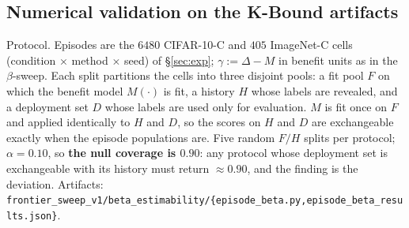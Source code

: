 \subsection{Numerical validation on the K-Bound artifacts}
\label{epi:sec-numerics}

Protocol. Episodes are the $6480$ CIFAR-10-C and $405$ ImageNet-C cells (condition $\times$ method
$\times$ seed) of \S\ref{sec:exp}; $\gamma:=\Delta-M$ in benefit units as in the
$\beta$-sweep. Each split partitions the cells into three disjoint pools: a fit pool $F$ on which the
benefit model $M(\cdot)$ is fit, a history $H$ whose labels are revealed, and a deployment set $D$
whose labels are used only for evaluation. $M$ is fit once on $F$ and applied identically to $H$ and
$D$, so the scores on $H$ and $D$ are exchangeable exactly when the episode populations are. Five
random $F/H$ splits per protocol; $\alpha=0.10$, so \textbf{the null coverage is $0.90$}: any
protocol whose deployment set is exchangeable with its history must return $\approx0.90$, and the
finding is the deviation. Artifacts:
\texttt{frontier\_sweep\_v1/beta\_estimability/\{episode\_beta.py,episode\_beta\_results.json\}}.

